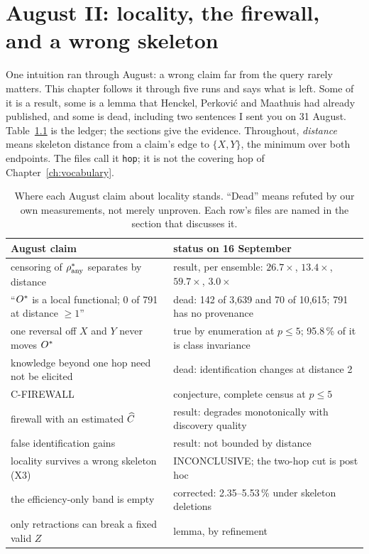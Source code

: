 \chapter{August II: locality, the firewall, and a wrong skeleton}
\label{ch:locality}

One intuition ran through August: a wrong claim far from the query rarely matters. This chapter
follows it through five runs and says what is left. Some of it is a result, some is a lemma that
Henckel, Perkovi\'c and Maathuis had already published, and some is dead, including two sentences I
sent you on 31 August. Table~\ref{tab:loc-status} is the ledger; the sections give the evidence.
Throughout, \emph{distance} means skeleton distance from a claim's edge to $\{X,Y\}$, the minimum
over both endpoints. The files call it \texttt{hop}; it is not the covering hop of
Chapter~\ref{ch:vocabulary}.

\begin{table}[htbp]
\centering\footnotesize
\begin{tabular}{@{}>{\raggedright\arraybackslash}p{7.0cm}>{\raggedright\arraybackslash}p{7.6cm}@{}}
\toprule
August claim & status on 16 September \\
\midrule
censoring of $\rho^{*}_{\mathrm{any}}$ separates by distance & result, per ensemble: $26.7\times$,
$13.4\times$, $59.7\times$, $3.0\times$ \\
``$O^{*}$ is a local functional; 0 of 791 at distance $\ge 1$'' & dead: 142 of 3,639 and 70 of
10,615; 791 has no provenance \\
one reversal off $X$ and $Y$ never moves $O^{*}$ & true by enumeration at $p \le 5$; 95.8\,\% of
it is class invariance \\
knowledge beyond one hop need not be elicited & dead: identification changes at distance 2 \\
C-FIREWALL & conjecture, complete census at $p \le 5$ \\
firewall with an estimated $\widehat{C}$ & result: degrades monotonically with discovery quality \\
false identification gains & result: not bounded by distance \\
locality survives a wrong skeleton (X3) & INCONCLUSIVE; the two-hop cut is post hoc \\
the efficiency-only band is empty & corrected: 2.35--5.53\,\% under skeleton deletions \\
only retractions can break a fixed valid $Z$ & lemma, by refinement \\
\bottomrule
\end{tabular}
\caption{Where each August claim about locality stands. ``Dead'' means refuted by our own
measurements, not merely unproven. Each row's files are named in the section that discusses it.}
\label{tab:loc-status}
\end{table}

